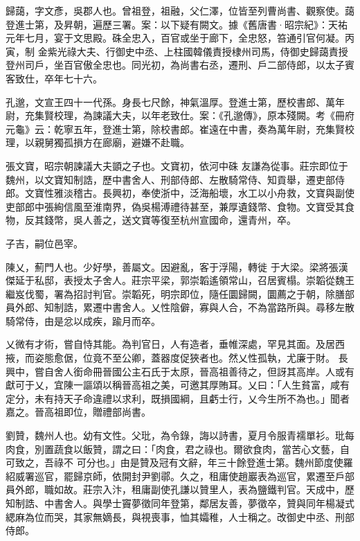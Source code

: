 \begin{pinyinscope}
 歸藹，字文彥，吳郡人也。曾祖登，祖融，父仁澤，位皆至列曹尚書、觀察使。藹登進士第，及昇朝，遍歷三署。案：以下疑有闕文。據《舊唐書·昭宗紀》：天祐元年七月，宴于文思殿。硃全忠入，百官或坐于廊下，全忠怒，笞通引官何凝。丙寅，制
 金紫光祿大夫、行御史中丞、上柱國韓儀責授棣州司馬，侍御史歸藹責授登州司戶，坐百官傲全忠也。同光初，為尚書右丞，遷刑、戶二部侍郎，以太子賓客致仕，卒年七十六。



 孔邈，文宣王四十一代孫。身長七尺餘，神氣溫厚。登進士第，歷校書郎、萬年尉，充集賢校理，為諫議大夫，以年老致仕。案：《孔邈傳》，原本殘闕。考《冊府元龜》云：乾寧五年，登進士第，除校書郎。崔遠在中書，奏為萬年尉，充集賢校理，以親舅獨孤損方在廊廟，避嫌不赴職。



 張文寶，昭宗朝諫議大夫顗之子也。文寶初，依河中硃
 友謙為從事。莊宗即位于魏州，以文寶知制誥，歷中書舍人、刑部侍郎、左散騎常侍、知貢舉，遷吏部侍郎。文寶性雅淡稽古。長興初，奉使浙中，泛海船壞，水工以小舟救，文寶與副使吏部郎中張絢信風至淮南界，偽吳楊溥禮待甚至，兼厚遺錢幣、食物。文寶受其食物，反其錢幣，吳人善之，送文寶等復至杭州宣國命，還青州，卒。



 子吉，嗣位邑宰。



 陳乂，薊門人也。少好學，善屬文。因避亂，客于浮陽，轉徙
 于大梁。梁將張漢傑延于私邸，表授太子舍人。莊宗平梁，郭崇韜遙領常山，召居賓榻。崇韜從魏王繼岌伐蜀，署為招討判官。崇韜死，明宗即位，隨任圜歸闕，圜薦之于朝，除膳部員外郎、知制誥，累遷中書舍人。乂性陰僻，寡與人合，不為當路所與。尋移左散騎常侍，由是忿以成疾，踰月而卒。



 乂微有才術，嘗自恃其能。為判官日，人有造者，垂帷深處，罕見其面。及居西掖，而姿態愈倨，位竟不至公卿，蓋器度促狹者也。然乂性孤執，尤廉于財。
 長興中，嘗自舍人銜命冊晉國公主石氏于太原，晉高祖善待之，但訝其高岸。人或有獻可于乂，宜陳一謳頌以稱晉高祖之美，可邀其厚賄耳。乂曰：「人生貧富，咸有定分，未有持天子命違禮以求利，既損國綱，且虧士行，乂今生所不為也。」聞者嘉之。晉高祖即位，贈禮部尚書。



 劉贊，魏州人也。幼有文性。父玭，為令錄，誨以詩書，夏月令服青襦單衫。玭每肉食，別置蔬食以飯贊，謂之曰：「肉食，君之祿也。爾欲食肉，當苦心文藝，自可致之，吾祿不
 可分也。」由是贊及冠有文辭，年三十餘登進士第。魏州節度使羅紹威署巡官，罷歸京師，依開封尹劉鄩。久之，租庸使趙巖表為巡官，累遷至戶部員外郎，職如故。莊宗入汴，租庸副使孔謙以贊里人，表為鹽鐵判官。天成中，歷知制誥、中書舍人。與學士竇夢徵同年登第，鄰居友善，夢徵卒，贊與同年楊凝式緦麻為位而哭，其家無嫡長，與視喪事，恤其孀稚，人士稱之。改御史中丞、刑部侍郎。




\end{pinyinscope}
